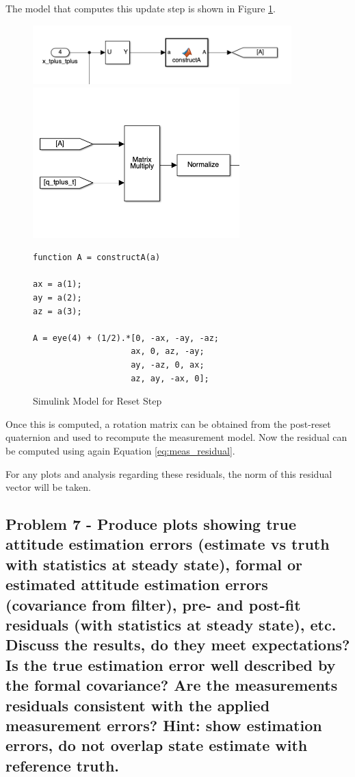 The model that computes this update step is shown in Figure \ref{fig:quat_reset_step}.

\begin{figure}[H]
    \centering
    \includegraphics[width = 10cm]{Images/PS8/quat_update_2.png}
    \includegraphics[width = 8cm]{Images/PS8/quat_update_1.png}
\end{figure}

\begin{figure}[H]
    \centering
    \captionsetup{ justification = centering }
    \begin{lstlisting}
function A = constructA(a)

ax = a(1);
ay = a(2);
az = a(3);

A = eye(4) + (1/2).*[0, -ax, -ay, -az;
                    ax, 0, az, -ay;
                    ay, -az, 0, ax;
                    az, ay, -ax, 0];
    \end{lstlisting}
    \caption{Simulink Model for Reset Step}
    \label{fig:quat_reset_step}
\end{figure}

Once this is computed, a rotation matrix can be obtained from the post-reset quaternion and used to recompute the measurement model. Now the residual can be computed using again Equation \ref{eq:meas_residual}.

For any plots and analysis regarding these residuals, the norm of this residual vector will be taken.

\subsection{Problem 7 - Produce plots showing true attitude estimation errors (estimate vs truth with statistics at steady state), formal or estimated attitude estimation errors (covariance from filter), pre- and post-fit residuals (with statistics at steady state), etc. Discuss the results, do they meet expectations? Is the true estimation error well described by the formal covariance? Are the measurements residuals consistent with the applied measurement errors? Hint: show estimation errors, do not overlap state estimate with reference truth.}

